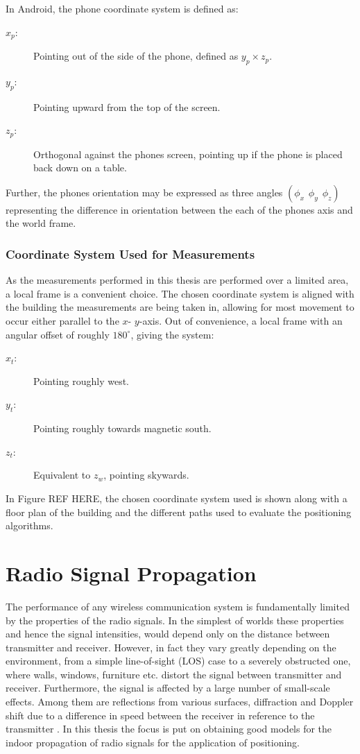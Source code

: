 \documentclass{LTHthesis}
\begin{document}
In Android, the phone coordinate system is defined as: 
%
\begin{description}
\item[$x_p$:] Pointing out of the side of the phone, defined as $y_p \times z_p$.
\item[$y_p$:] Pointing upward from the top of the screen.
\item[$z_p$:] Orthogonal against the phones screen, pointing up if the phone is placed back down on a table.
\end{description}
%
Further, the phones orientation may be expressed as three angles $(\phi_x \hspace{5pt} \phi_y \hspace{5pt} \phi_z)$ representing the difference in orientation between the each of the phones axis and the world frame.
%
\subsection{Coordinate System Used for Measurements}
%
As the measurements performed in this thesis are performed over a limited area, a local frame is a convenient choice. The chosen coordinate system is aligned with the building the measurements are being taken in, allowing for most movement to occur either parallel to the $x$- $y$-axis. Out of convenience, a local frame with an angular offset of roughly $180^\circ$, giving the system:
%
\begin{description}
\item[$x_t$:] Pointing roughly west. 
\item[$y_t$:] Pointing roughly towards magnetic south.
\item[$z_t$:] Equivalent to $z_w$, pointing skywards.
\end{description}
%
In Figure REF HERE, the chosen coordinate system used is shown along with a floor plan of the building and the different paths used to evaluate the positioning algorithms.
%
\chapter{Radio Signal Propagation}
%
\label{chap:RSP}
%
The performance of any wireless communication system is fundamentally limited by the properties of the radio signals. In the simplest of worlds these properties and hence the signal intensities, would depend only on the distance between transmitter and receiver. However, in fact they vary greatly depending on the environment, from a simple line-of-sight (LOS) case to a severely obstructed one, where walls, windows, furniture etc. distort the signal between transmitter and receiver. Furthermore, the signal is affected by a large number of small-scale effects. Among them are reflections from various surfaces, diffraction and Doppler shift due to a difference in speed between the receiver in reference to the transmitter \cite{rappaport96}. In this thesis the focus is put on obtaining good models for the indoor propagation of radio signals for the application of positioning. 
\end{document}
